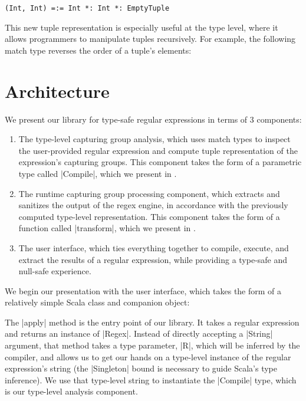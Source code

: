 \begin{diff}
\begin{lstlisting}
(Int, Int) =:= Int *: Int *: EmptyTuple
\end{lstlisting}

\noindent
This new tuple representation is especially useful at the type level, where it allows programmers to manipulate tuples recursively.
For example, the following match type reverses the order of a tuple's elements:

\tupleReverseA
\vspace{-3pt}
\tupleReverseB
\end{diff}

\section{Architecture}
\label{sec:architecture}

\begin{diff}
We present our library for type-safe regular expressions in terms of 3 components:
\end{diff}

\begin{enumerate}
  \item The type-level capturing group analysis, which uses match types to inspect the user-provided regular expression and compute tuple representation of the expression's capturing groups.
  This component takes the form of a parametric type called |Compile|, which we present in .

  \item The runtime capturing group processing component, which extracts and sanitizes the output of the regex engine, in accordance with the previously computed type-level representation.
  This component takes the form of a function called |transform|, which we present in .

  \item The user interface, which ties everything together to compile, execute, and extract the results of a regular expression, while providing a type-safe and null-safe experience.
\end{enumerate}

We begin our presentation with the user interface, which takes the form of a relatively simple Scala class and companion object:

\regexUserLevel

The |apply| method is the entry point of our library.
It takes a regular expression and returns an instance of |Regex|.
Instead of directly accepting a |String| argument, that method takes a type parameter, |R|, which will be inferred by the compiler, and allows us to get our hands on a type-level instance of the regular expression's string (the |Singleton| bound is necessary to guide Scala's type inference).
We use that type-level string to instantiate the |Compile| type, which is our type-level analysis component.

